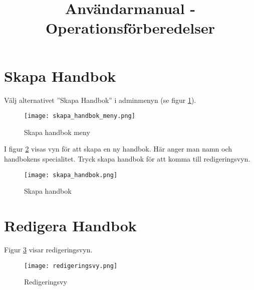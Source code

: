 \documentclass[12pt]{amsart}
\title{Användarmanual - Operationsförberedelser}
\date{} %
\begin{document}
\maketitle
\tableofcontents

\section{Skapa Handbok}
Välj alternativet ''Skapa Handbok'' i adminmenyn (se figur \ref{fig:skapa_handbok_meny}).

\begin{figure}[H]
	\begin{center}
	\texttt{[image: skapa\_handbok\_meny.png]}
	\caption{Skapa handbok meny}
	\label{fig:skapa_handbok_meny}
	\end{center}
\end{figure}

I figur \ref{fig:skapa_handbok} visas vyn för att skapa en ny handbok. Här anger man namn och handbokens specialitet. Tryck skapa handbok för att komma till redigeringsvyn. 
 \begin{figure}[H]
	\begin{center}
	\texttt{[image: skapa\_handbok.png]}
	\caption{Skapa handbok}
	\label{fig:skapa_handbok}
	\end{center}
\end{figure}
 
 \section{Redigera Handbok}
Figur \ref{fig:redigeringsvy} visar redigeringsvyn.

  \begin{figure}[H]
	\begin{center}
	\texttt{[image: redigeringsvy.png]}
	\caption{Redigeringsvy}
	\label{fig:redigeringsvy}
	\end{center}
\end{figure}
\end{document}
